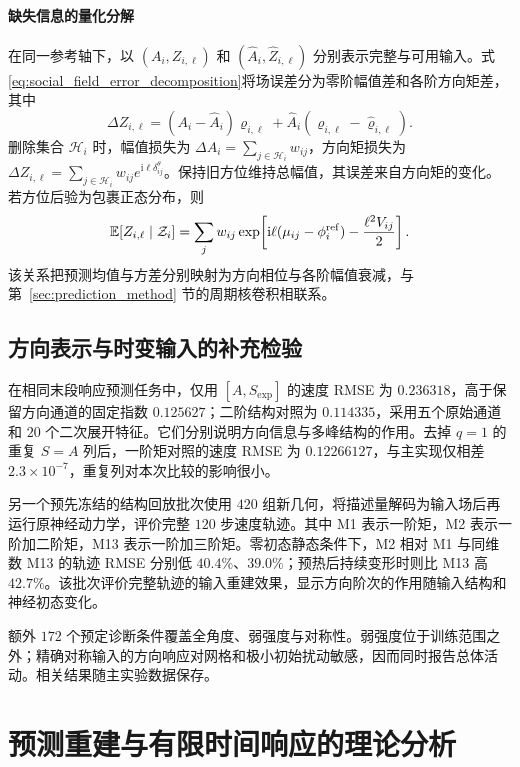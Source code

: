 \documentclass[UTF8,fontset=windows,11pt]{ctexart}
\begin{document}
\paragraph{缺失信息的量化分解}
在同一参考轴下，以 $(A_i,Z_{i,\ell})$ 和 $(\widehat A_i,\widehat Z_{i,\ell})$ 分别表示完整与可用输入。式\eqref{eq:social_field_error_decomposition}将场误差分为零阶幅值差和各阶方向矩差，其中
\begin{equation}
 \Delta Z_{i,\ell}=(A_i-\widehat A_i)\varrho_{i,\ell}
 +\widehat A_i(\varrho_{i,\ell}-\widehat\varrho_{i,\ell}).
 \label{eq:missing_input_decomposition}
\end{equation}
删除集合 $\mathcal H_i$ 时，幅值损失为 $\Delta A_i=\sum_{j\in\mathcal H_i}w_{ij}$，方向矩损失为 $\Delta Z_{i,\ell}=\sum_{j\in\mathcal H_i}w_{ij}e^{\mathrm i\ell\delta^\theta_{ij}}$。保持旧方位维持总幅值，其误差来自方向矩的变化。若方位后验为包裹正态分布，则
\begin{equation}
 \mathbb E[Z_{i,\ell}\mid\mathcal Z_i]
 =\sum_jw_{ij}\exp\!\left[\mathrm i\ell(\mu_{ij}-\phi_i^{\rm ref})-\frac{\ell^2V_{ij}}2\right].
\end{equation}
该关系把预测均值与方差分别映射为方向相位与各阶幅值衰减，与第~\ref{sec:prediction_method} 节的周期核卷积相联系。

\subsection{方向表示与时变输入的补充检验}\label{app:structure_experiment}
在相同末段响应预测任务中，仅用 $[A,S_{\exp}]$ 的速度 RMSE 为 $0.236318$，高于保留方向通道的固定指数 $0.125627$；二阶结构对照为 $0.114335$，采用五个原始通道和 $20$ 个二次展开特征。它们分别说明方向信息与多峰结构的作用。去掉 $q=1$ 的重复 $S=A$ 列后，一阶矩对照的速度 RMSE 为 $0.12266127$，与主实现仅相差 $2.3\times10^{-7}$，重复列对本次比较的影响很小。

另一个预先冻结的结构回放批次使用 $420$ 组新几何，将描述量解码为输入场后再运行原神经动力学，评价完整 $120$ 步速度轨迹。其中 M1 表示一阶矩，M2 表示一阶加二阶矩，M13 表示一阶加三阶矩。零初态静态条件下，M2 相对 M1 与同维数 M13 的轨迹 RMSE 分别低 $40.4\%$、$39.0\%$；预热后持续变形时则比 M13 高 $42.7\%$。该批次评价完整轨迹的输入重建效果，显示方向阶次的作用随输入结构和神经初态变化。


额外 $172$ 个预定诊断条件覆盖全角度、弱强度与对称性。弱强度位于训练范围之外；精确对称输入的方向响应对网格和极小初始扰动敏感，因而同时报告总体活动。相关结果随主实验数据保存。

\section{预测重建与有限时间响应的理论分析}\label{sec:theory}
\end{document}
